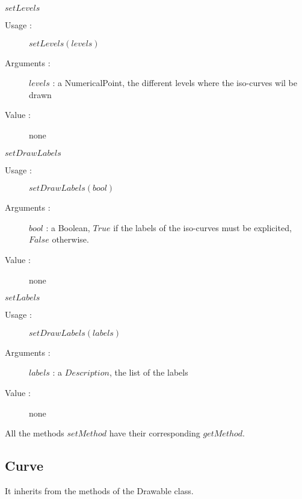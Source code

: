 \begin{description}
\begin{description}
  \item $setLevels$
    \begin{description}
    \item[Usage :] $setLevels(levels)$
    \item[Arguments :] $levels$ : a NumericalPoint, the different levels where the iso-curves wil be drawn
    \item[Value :] none
    \end{description}
    \bigskip

  \item $setDrawLabels$
    \begin{description}
    \item[Usage :] $setDrawLabels(bool)$
    \item[Arguments :] $bool$ : a Boolean, $True$ if the labels of the iso-curves must be explicited, $False$ otherwise.
    \item[Value :] none
    \end{description}
    \bigskip

  \item $setLabels$
    \begin{description}
    \item[Usage :] $setDrawLabels(labels)$
    \item[Arguments :] $labels$ : a $Description$, the list of the labels
    \item[Value :] none
    \end{description}
    \bigskip
  \end{description}

  All the methods $setMethod$ have their corresponding $getMethod$.

\end{description}


\newpage \subsection{Curve}

It inherits from the methods of the Drawable class.

